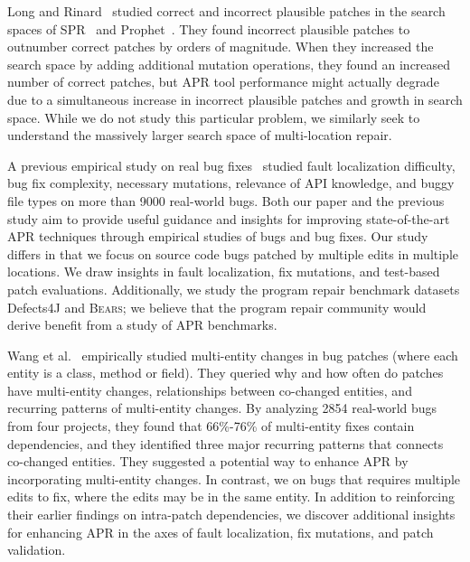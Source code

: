 \documentclass[10pt, conference]{IEEEtran}
\newcommand\bears{\textsc{Bears}\xspace}
\begin{document}
Long and Rinard~\cite{long-search-spaces} studied
correct and incorrect plausible patches in the search spaces of SPR~\cite{spr} 
and Prophet~\cite{prophet}. They found incorrect plausible patches to outnumber 
correct patches by orders of magnitude. When they increased the search space 
by adding additional mutation operations, they found an increased number of 
correct patches, but APR tool performance might actually degrade due to a 
simultaneous increase in incorrect plausible patches and growth in search space.  
While we do not study this particular problem, 
we similarly seek to understand the 
massively larger search space of multi-location repair. 

A previous empirical study on real bug fixes~\cite{zhong2015} 
studied fault localization difficulty, bug fix complexity, necessary
mutations, relevance of API knowledge, and buggy file types
on more than 9000 real-world bugs.  
Both our paper and the previous study aim to provide useful guidance and insights for 
improving state-of-the-art APR techniques through empirical studies of bugs and bug fixes. 
Our study differs in that we focus on 
source code bugs patched by multiple edits in multiple locations. 
We draw insights in fault localization, fix mutations, and test-based 
patch evaluations. Additionally, we study the program repair 
benchmark datasets Defects4J 
and \bears; we believe that the program repair community would derive 
benefit from a study of APR benchmarks.

Wang et al.~\cite{wang2018} empirically studied multi-entity changes in bug patches 
(where each entity is a class, method or field). They queried
why and how often do patches have multi-entity changes, relationships 
between co-changed entities, and recurring patterns of multi-entity changes. 
By analyzing 2854 real-world bugs from four projects, they found that 66\%-76\% of
multi-entity fixes contain dependencies, 
and they identified three major recurring patterns that connects co-changed entities. 
They suggested a potential way to 
enhance APR by incorporating multi-entity changes. In contrast, we on bugs that
requires multiple edits to fix, where the edits may be in the same entity. In addition 
to reinforcing their earlier findings on intra-patch dependencies, we discover 
additional insights for enhancing APR in the axes of fault localization, 
fix mutations, and patch validation.
\end{document}
